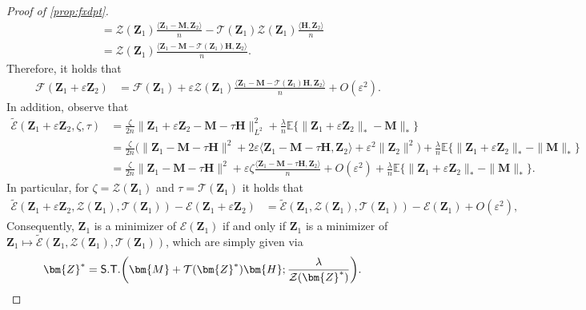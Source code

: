 \documentclass[10pt]{article}
\newcommand{\eps}{\ensuremath{\varepsilon}}
\newcommand{\s}{^*}
\renewcommand{\tilde}{\widetilde}
\theoremstyle{definition}
\begin{document}
\begin{proof}[Proof of \cref{prop:fxdpt}]
\begin{align}
    &=  \mathcal{Z}(\bm{Z}_1) \frac{\langle \bm{Z}_1 - \bm{M}, \bm{Z}_2 \rangle}{n} -  \mathcal{T}(\bm{Z}_1) \mathcal{Z}(\bm{Z}_1) \frac{\langle \bm{H}, \bm{Z}_2 \rangle}{n} \\
    &=  \mathcal{Z}(\bm{Z}_1)  \frac{\langle \bm{Z}_1 - \bm{M} - \mathcal{T}(\bm{Z}_1) \bm {H} , \bm{Z}_2\rangle}{n}.
\end{align}
Therefore, it holds that
\begin{align}
    \mathcal{F}(\bm{Z}_1 + \eps \bm{Z}_2) &= \mathcal{F}(\bm{Z}_1) + \eps  \mathcal{Z}(\bm{Z}_1) \frac{\langle \bm{Z}_1 - \bm{M} - \mathcal{T}(\bm{Z}_1) \bm {H} , \bm{Z}_2\rangle}{n} + O(\eps^2).
\end{align}
In addition, observe that
\begin{align}
    \mathcal{\tilde E}(\bm{Z}_1 + \eps \bm{Z}_2, \zeta,\tau) &= \frac{\zeta}{2n} \| \bm{Z}_1 + \eps \bm{Z}_2 - \bm{M} - \tau \bm{H} \|_{L^2}^2 + \frac{\lambda}{n} \mathbb{E} \big\{ \|\bm{Z}_1 + \eps \bm{Z}_2 \|_* - \bm{M}\|_* \big\} \\
    &= \frac{\zeta}{2n} \bigg( \| \bm{Z}_1 - \bm{M} - \tau \bm{H} \|^2 + 2 \eps \langle \bm{Z}_1 - \bm{M} - \tau \bm{H}, \bm{Z}_2 \rangle + \eps^2 \| \bm{Z}_2\|^2 \bigg) + \frac{\lambda}{n} \mathbb{E} \big\{ \| \bm{Z}_1 + \eps \bm{Z}_2 \|_* - \| \bm{M} \|_* \big\} \\
    &= \frac{\zeta}{2n} \| \bm{Z}_1 - \bm{M} - \tau \bm{H} \|^2 +  \eps  \zeta  \frac{\langle \bm{Z}_1 - \bm{M} -\tau  \bm {H} , \bm{Z}_2\rangle}{n} + O(\eps^2) + \frac{\lambda}{n} \mathbb{E} \big\{ \| \bm{Z}_1 + \eps \bm{Z}_2 \|_* - \| \bm{M} \|_* \big\}.
\end{align}
In particular, for $\zeta = \mathcal{Z}(\bm{Z}_1)$ and $\tau = \mathcal{T}(\bm{Z}_1)$ it holds that
\begin{align}
    \mathcal{\tilde E}(\bm{Z}_1 + \eps \bm{Z}_2, \mathcal{Z}(\bm{Z}_1), \mathcal{T}(\bm{Z}_1)) - \mathcal{E} ( \bm{Z}_1 + \eps \bm{Z}_2 ) &=  \mathcal{\tilde E}(\bm{Z}_1 , \mathcal{Z}(\bm{Z}_1), \mathcal{T}(\bm{Z}_1)) - \mathcal{E} ( \bm{Z}_1 ) + O(\eps^2),
\end{align}
Consequently,  $\bm{Z}_1$ is a minimizer of $\mathcal{E}(\bm{Z}_1)$ if and only if $\bm{Z}_1$ is a minimizer of $\bm{Z}_1 \mapsto \mathcal{\tilde E}(\bm{Z}_1, \mathcal{Z}(\bm{Z}_1), \mathcal{T}(\bm{Z}_1))$, which are simply given via
\begin{align}
    \bm{Z}\s &= {\sf S.T.} \bigg( \bm{M} + \mathcal{T}(\bm{Z}\s) \bm{H} ; \frac{\lambda}{\mathcal{Z}(\bm{Z}\s)} \bigg).
\end{align}

\end{proof}
\end{document}
